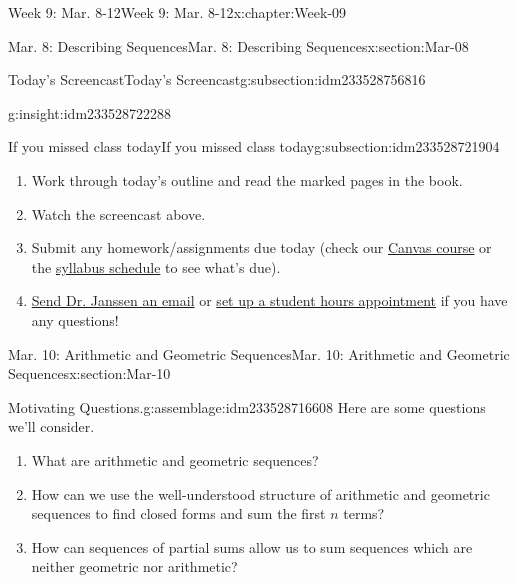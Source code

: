 \documentclass[oneside,10pt,]{book}
\numberwithin{equation}{section}
\begin{document}
\begin{chapterptx}{Week 9: Mar. 8-12}{}{Week 9: Mar. 8-12}{}{}{x:chapter:Week-09}
\begin{sectionptx}{Mar. 8: Describing Sequences}{}{Mar. 8: Describing Sequences}{}{}{x:section:Mar-08}
\begin{subsectionptx}{Today's Screencast}{}{Today's Screencast}{}{}{g:subsection:idm233528756816}
\begin{insight}{}{g:insight:idm233528722288}
\begin{tcbraster}[raster columns=2, raster column skip=1pt, raster halign=center, raster force size=false, raster left skip=0pt, raster right skip=0pt]
\begin{tcolorbox}[qrstyle]%
[QR LINK]\end{tcolorbox}%
\end{tcbraster}%
\end{insight}
\end{subsectionptx}
%
%
\typeout{************************************************}
\typeout{************************************************}
%
\begin{subsectionptx}{If you missed class today}{}{If you missed class today}{}{}{g:subsection:idm233528721904}
%
\begin{enumerate}
\item{}Work through today's outline and read the marked pages in the book.%
\item{}Watch the screencast above.%
\item{}Submit any homework\slash{}assignments due today (check our \href{https://dordt.instructure.com/courses/3110050}{Canvas course} or the \href{https://prof.mkjanssen.org/ds/index.html\#schedule}{syllabus schedule} to see what's due).%
\item{}\href{mailto:mike.janssen@dordt.edu}{Send Dr. Janssen an email} or \href{https://calendly.com/mkjanssen/student-hours}{set up a student hours appointment} if you have any questions!%
\end{enumerate}
\end{subsectionptx}
\end{sectionptx}
%
%
\typeout{************************************************}
\typeout{************************************************}
%
\begin{sectionptx}{Mar. 10: Arithmetic and Geometric Sequences}{}{Mar. 10: Arithmetic and Geometric Sequences}{}{}{x:section:Mar-10}
\begin{introduction}{}%
\begin{assemblage}{Motivating Questions.}{g:assemblage:idm233528716608}%
Here are some questions we'll consider. %
\begin{enumerate}
\item{}What are arithmetic and geometric sequences?%
\item{}How can we use the well-understood structure of arithmetic and geometric sequences to find closed forms and sum the first \(n\) terms?%
\item{}How can sequences of partial sums allow us to sum sequences which are neither geometric nor arithmetic?%

\end{enumerate}
\end{assemblage}
\end{introduction}
\end{sectionptx}
\end{chapterptx}
\end{document}
